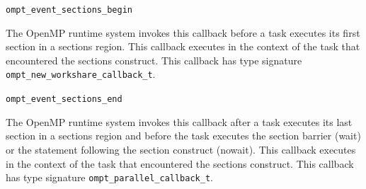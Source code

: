 \documentclass{article}
\newcommand{\descheader}[1]{{\needspace{3\baselineskip}\vspace{1em}\noindent \fbox{#1}}}
\begin{document}
\begin{description}
\item \verb|ompt_event_sections_begin|
 
  The OpenMP runtime system invokes this callback before a task executes its first section in a sections region.
  This callback executes in the context of
  the task that encountered the sections construct.
  This callback has type signature \verb|ompt_new_workshare_callback_t|. 

\item \verb|ompt_event_sections_end|

 \sloppy
  The OpenMP runtime system invokes this callback after a task executes  its last
  section in a sections region and before the task
  executes the section barrier (wait) or the statement following the
  section construct (nowait). This callback executes in the context
  of the task that encountered the sections construct.
This callback has type signature \verb|ompt_parallel_callback_t|. 

\end{description}

\descheader{Single Blocks}
\end{document}
